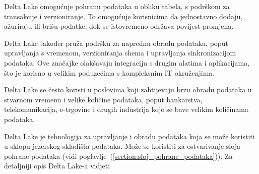 Delta Lake omogućuje pohranu podataka u obliku tabela, s podrškom za transakcije
i verzioniranje. To omogućuje korisnicima da jednostavno dodaju, ažuriraju ili
brišu podatke, dok se istovremeno održava povijest promjena.

Delta Lake također pruža podršku za naprednu obradu podataka, poput upravljanja
s vremenom, verzioniranja shema i upravljanja sinkronizacijom podataka. Ove
značajke olakšavaju integraciju s drugim alatima i aplikacijama, što je korisno
u velikim poduzećima s kompleksnim IT okruženjima.

Delta Lake se često koristi u poslovima koji zahtijevaju brzu obradu podataka u
stvarnom vremenu i velike količine podataka, poput bankarstva, telekomunikacija,
e-trgovine i drugih industrija koje se bave velikim količinama podataka.

Delta Lake je tehnologija za upravljanje i obradu podataka koja se može
koristiti u sklopu jezerskog skladišta podataka. Može se koristiti za
ostvarivanje sloja pohrane podataka (vidi
poglavlje~(\ref{section:sloj_pohrane_podataka})). Za detaljniji opis Delta
Lake-a vidjeti
\cite{deltalake2023}
